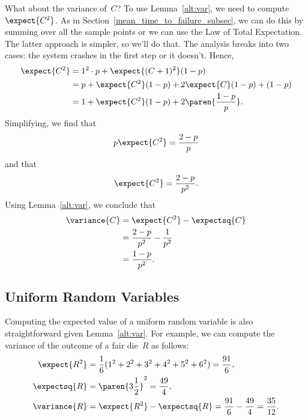 What about the variance of~$C$?  To use Lemma~\ref{alt:var}, we need
to compute~$\expect{C^2}$.  As in
Section~\ref{mean_time_to_failure_subsec}, we can do this by summing
over all the sample points or we can use the Law of Total
Expectation.  The latter approach is simpler, so we'll do that.  The
analysis breaks into two cases: the system crashes in the first step
or it doesn't.  Hence,
\begin{align*}
\expect{C^2}
    &= 1^2 \cdot p + \expect{(C + 1)^2} (1 - p) \\
    &= p + \expect{C^2} (1 - p) + 2 \expect{C} (1 - p) + (1 - p) \\
    &= 1 + \expect{C^2} (1 - p) + 2 \paren{\frac{1 - p}{p}}.
\end{align*}
Simplifying, we find that
\begin{equation*}
    p \expect{C^2} = \frac{2 - p}{p}
\end{equation*}
and that
\begin{equation*}
    \expect{C^2} = \frac{2 - p}{p^2}.
\end{equation*}
Using Lemma~\ref{alt:var}, we conclude that
\begin{align*}
\variance{C}
    &= \expect{C^2} - \expectsq{C} \\
    &= \frac{2 - p}{p^2} - \frac{1}{p^2} \\
    &= \frac{1 - p}{p^2}.
\end{align*}

\subsection{Uniform Random Variables}

Computing the expected value of a uniform random variable is also
straightforward given Lemma~\ref{alt:var}.  For example, we can
compute the variance of the outcome of a fair die~$R$ as follows:
\begin{align*}
\expect{R^2}
    &= \frac{1}{6} (1^2 + 2^2 + 3^2 + 4^2 + 5^2 + 6^2) = \frac{91}{6},\\
\expectsq{R}
    &= \paren{3\frac{1}{2}}^2 = \frac{49}{4}, \\
\variance{R}
    &= \expect{R^2} - \expectsq{R} = \frac{91}{6} - \frac{49}{4}
        = \frac{35}{12}.
\end{align*}

